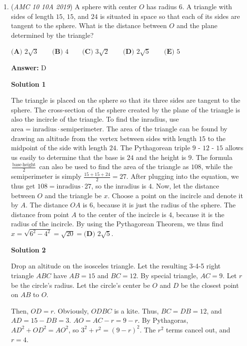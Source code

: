 \begin{enumerate}
 


	\item (\textit{AMC 10 10A 2019}) A sphere with center $O$ has radius 6. A triangle with sides of length $15$, $15$, and $24$ is situated in space so that each of its sides are tangent to the sphere. What is the distance between $O$ and the plane determined by the triangle?


 $\textbf{(A) } 2\sqrt{3} \qquad \textbf{(B) }4 \qquad \textbf{(C) } 3\sqrt{2} \qquad \textbf{(D) } 2\sqrt{5} \qquad \textbf{(E) } 5$

 \textbf{Answer: }D



\textbf{Solution 1}

The triangle is placed on the sphere so that its three sides are tangent to the sphere. The cross-section of the sphere created by the plane of the triangle is also the incircle of the triangle. To find the inradius, use $\text{area} = \text{inradius} \cdot \text{semiperimeter}$. The area of the triangle can be found by drawing an altitude from the vertex between sides with length $15$ to the midpoint of the side with length $24$. The Pythagorean triple $9$ - $12$ - $15$ allows us easily to determine that the base is $24$ and the height is $9$. The formula $\frac {\text{base} \cdot \text{height}} {2}$ can also be used to find the area of the triangle as $108$, while the semiperimeter is simply $\frac {15 + 15 + 24} {2} = 27$. After plugging into the equation, we thus get $108 = \text{inradius} \cdot 27$, so the inradius is $4$. Now, let the distance between $O$ and the triangle be $x$. Choose a point on the incircle and denote it by $A$. The distance $OA$ is $6$, because it is just the radius of the sphere. The distance from point $A$ to the center of the incircle is $4$, because it is the radius of the incircle. By using the Pythagorean Theorem, we thus find $x = \sqrt{6^2-4^2}=\sqrt{20} = \boxed{\textbf {(D) } 2 \sqrt {5}}$.

 



\textbf{Solution 2}

Drop an altitude on the isosceles triangle. Let the resulting 3-4-5 right triangle $ABC$ have $AB=15$ and $BC=12$. By special triangle, $AC=9$. Let $r$ be the circle's radius. Let the circle's center be $O$ and $D$ be the closest point on $AB$ to $O$.

 
Then, $OD=r$. Obviously, $ODBC$ is a kite. Thus, $BC=DB=12$, and $AD=15-DB=3$. $AO=AC-r=9-r$. By Pythagoras, $AD^2+OD^2=AO^2$, so $3^2+r^2=(9-r)^2$. The $r^2$ terms cancel out, and $r=4$. 


\end{enumerate}
